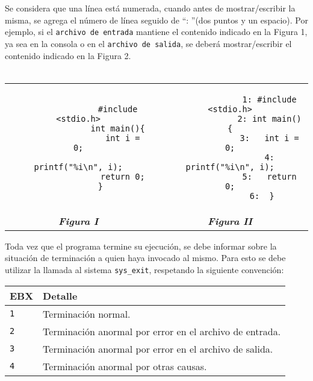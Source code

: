 \documentclass[12pt,a4paper]{article}
\begin{document}
Se considera que una línea está numerada, cuando antes de mostrar/escribir la misma, se agrega el número de línea seguido de ``: ''(dos puntos y un espacio). Por ejemplo, si el \texttt{archivo de entrada} mantiene el contenido indicado en la Figura 1, ya sea en la consola o en el \texttt{archivo de salida}, se deberá mostrar/escribir el contenido indicado en la Figura 2. \\ \\
\begin{centering}
	\begin{tabular}[t]{c|c}
		\begin{minipage}[t]{0.50\textwidth}
			\begin{verbatim}
				#include <stdio.h>
				int main(){
				  int i = 0;
				  printf("%i\n", i);
				  return 0;
				}		
			\end{verbatim}
		\end{minipage} &
		\begin{minipage}[t]{0.50\textwidth}
			\begin{verbatim}
				1: #include <stdio.h>
				2: int main(){
				3:   int i = 0;
				4:   printf("%i\n", i);
				5:   return 0;
				6:  }	
			\end{verbatim}
		\end{minipage} \\
		\textbf{\textit{Figura I}} & \textbf{\textit{Figura II}}
	\end{tabular}
\end{centering}

Toda vez que el programa termine su ejecución, se debe informar sobre la situación de terminación a quien haya invocado al mismo. Para esto se debe utilizar la llamada al sistema \texttt{sys\_exit}, respetando la siguiente convención:
\begin{center}
	\begin{tabular}[t]{|l|l|}
		\hline \textbf{EBX} & \textbf{Detalle} \\ \hline
		\texttt{1} & Terminación normal. \\ \hline
		\texttt{2} & Terminación anormal por error en el archivo de entrada. \\ \hline
		\texttt{3} & Terminación anormal por error en el archivo de salida.\\ \hline
		\texttt{4} & Terminación anormal por otras causas.\\ \hline
	\end{tabular}
\end{center}
\end{document}
